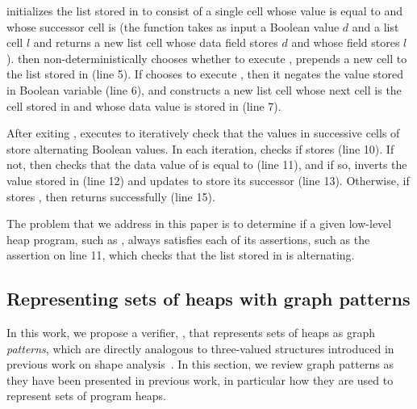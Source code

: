 \altlist initializes the list stored in \lsnm to consist of a single
cell whose value is equal to \datavarnm and whose successor cell is
\nilconst (the function \consls takes as input a Boolean value $d$ and
a list cell $l$ and returns a new list cell whose data field stores
$d$ and whose \nextnm field stores $l$).
%
\altlist then non-deterministically chooses whether to execute
\consloop, prepends a new cell to the list stored in \lsnm (line 5).
%
If \altlist chooses to execute \consloop, then it negates the value
stored in Boolean variable \datanm (line 6), and constructs a new list
cell whose next cell is the cell stored in \lsnm and whose data value
is stored in \datanm (line 7).

After exiting \consloop, \altlist executes \chkloop to iteratively
check that the values in successive cells of \lsnm store alternating
Boolean values.
%
In each iteration, \altlist checks if \lsnm stores \nilconst (line
10).
%
If not, then \altlist checks that the data value of \lsnm is equal to
\datanm (line 11), and if so, inverts the value stored in \datanm
(line 12) and updates \lsnm to store its successor (line 13).
%
Otherwise, if \lsnm stores \nilconst, then \altlist returns
successfully (line 15).

The problem that we address in this paper is to determine if a given
low-level heap program, such as \altlist, always satisfies each of its
assertions, such as the assertion on line 11, which checks that the
list stored in \lsnm is alternating.

\subsection{Representing sets of heaps with graph patterns}
\label{sec:ex-patterns}
In this work, we propose a verifier, \verifier, that represents sets
of heaps as graph \emph{patterns}, which are directly analogous to
three-valued structures introduced in previous work on shape
analysis~\cite{sagiv02}.
%
In this section, we review graph patterns as they have been presented
in previous work, in particular how they are used to represent sets of
program heaps.

